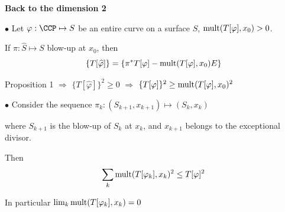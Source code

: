 \begin{slide}
\par\vspace{\bigskipamount}\noindent
{\bf Back to the dimension 2} 
\par\vspace{\bigskipamount}\noindent
$\bullet$ Let $\varphi:{\CCP}\mapsto {S}$ be an entire curve on a surface $S$, 
${\rm mult}(T[\varphi], x_0)> 0$. 

\hskip 0.3cm If $\pi:\widehat S\mapsto S$
blow-up at $x_0$, then
$$\{T[\widehat \varphi]\}= \{\pi^*T[\varphi]- {\rm mult}(T[\varphi], x_0)E\}$$
\par\vspace{\bigskipamount}\noindent
\hskip 0.3cm Proposition 1 \hskip 0.2cm $\Longrightarrow$  \hskip 0.2cm
$\{T[\widehat \varphi]\}^2\geq 0$  \hskip 0.2cm $\Longrightarrow$  \hskip 0.2cm
$\{T[\varphi]\}^2\geq {\rm mult}(T[\varphi], x_0)^2$

\par\vspace{\bigskipamount}\noindent
$\bullet$ Consider the sequence $\pi_k:(S_{k+ 1}, x_{k+1})\mapsto (S_{k}, x_{k})$

\hskip 0.3cm where $S_{k+1}$ is the blow-up of $S_k$ at $x_k$, and $x_{k+1}$ belongs to the
exceptional divisor. 

\hskip 0.3cm Then
$$\sum_k{\rm mult}(T[\varphi_k], x_k)^2\leq T[\varphi]^2$$

\hskip 0.3cm In particular \hskip 0.2cm $\lim_k{\rm mult}(T[\varphi_k], x_k)= 0$
\end{slide}

